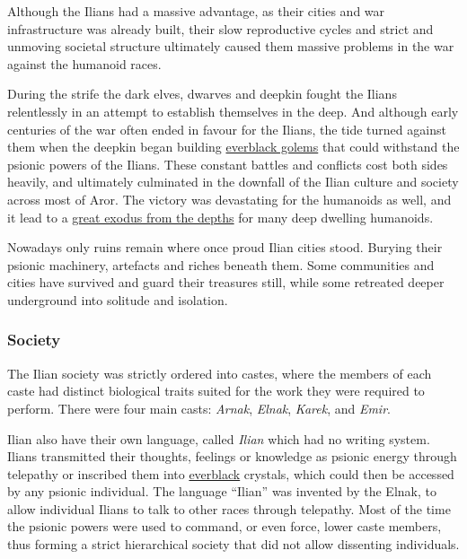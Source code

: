 Although the Ilians had a massive advantage, as their cities and war
infrastructure was already built, their slow reproductive cycles and strict
and unmoving societal structure ultimately caused them massive problems in
the war against the humanoid races.

During the strife the dark elves, dwarves and deepkin fought the Ilians
relentlessly in an attempt to establish themselves in the deep. And although
early centuries of the war often ended in favour for the Ilians, the tide
turned against them when the deepkin began building \hyperref[sec:Everblack
  Golem]{everblack golems} that could withstand the psionic powers of the
Ilians. These constant battles and conflicts cost both sides heavily, and
ultimately culminated in the downfall of the Ilian culture and society across
most of Aror. The victory was devastating for the humanoids as well, and it
lead to a \hyperref[sec:Exodus from the Depths]{great exodus from the depths}
for many deep dwelling humanoids.

Nowadays only ruins remain where once proud Ilian cities stood. Burying their
psionic machinery, artefacts and riches beneath them. Some communities and
cities have survived and guard their treasures still, while some retreated
deeper underground into solitude and isolation.

\subsubsection{Society}

The Ilian society was strictly ordered into castes, where the members of each
caste had distinct biological traits suited for the work they were required to
perform. There were four main casts: \emph{Arnak}, \emph{Elnak}, \emph{Karek},
and \emph{Emir}.

Ilian also have their own language, called \emph{Ilian} which had no writing
system. Ilians transmitted their thoughts, feelings or knowledge as psionic
energy through telepathy or inscribed them into
\hyperref[sec:Everblack]{everblack} crystals, which could then be accessed by
any psionic individual. The language ``Ilian'' was invented by the Elnak, to
allow individual Ilians to talk to other races through telepathy. Most of the
time the psionic powers were used to command, or even force, lower caste
members, thus forming a strict hierarchical society that did not allow
dissenting individuals.

